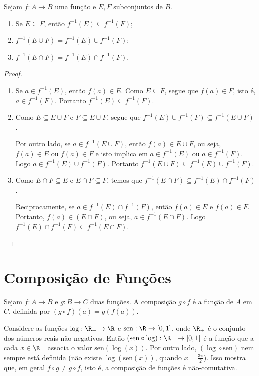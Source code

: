 \documentclass{article}
\begin{document}
\begin{proposition}\label{Img-inversa}
Sejam $f:A \rightarrow B$ uma fun\c{c}\~ao e $E, F$ subconjuntos de $B$.
\begin{enumerate}
    \item[(a)] Se $E \subseteq F$, ent\~ao $f^{-1}(E)\subseteq f^{-1}(F)$;
    \item[(b)] $f^{-1}(E \cup F)=f^{-1}(E)\cup f^{-1}(F)$;
    \item[(c)] $f^{-1}(E \cap F)=f^{-1}(E)\cap f^{-1}(F)$.
\end{enumerate}
\end{proposition}
\begin{proof}\mbox{}
\begin{enumerate}
    \item[(a)] Se $a \in f^{-1}(E)$, ent\~ao $f(a) \in E$.
    Como $E \subseteq F$, segue que $f(a) \in F$, isto \'e,
    $a \in f^{-1}(F)$. Portanto $f^{-1}(E)\subseteq f^{-1}(F)$.
    \item[(b)] Como $E \subseteq E \cup F$ e $F \subseteq E \cup
    F$, segue que $f^{-1}(E) \cup f^{-1}(F) \subseteq f^{-1}(E \cup
    F)$.

    Por outro lado, se $a \in f^{-1}(E \cup F)$, ent\~ao $f(a) \in E
    \cup F$, ou seja, $f(a) \in E$ ou $f(a) \in F$ e isto implica em
    $a \in f^{-1}(E)$ ou $a \in f^{-1}(F)$. Logo $a \in
    f^{-1}(E)\cup f^{-1}(F)$. Portanto $f^{-1}(E \cup F)
    \subseteq f^{-1}(E)\cup f^{-1}(F)$.
    \item[(c)] Como $E \cap F \subseteq E$ e $E \cap F \subseteq
    F$, temos que $f^{-1}(E \cap F)\subseteq f^{-1}(E)\cap
    f^{-1}(F)$.

    Reciprocamente, se $a \in f^{-1}(E) \cap f^{-1}(F)$, ent\~ao
    $f(a) \in E$ e $f(a) \in F$. Portanto, $f(a) \in (E \cap
    F)$, ou seja, $a \in f^{-1}(E \cap F)$. Logo $f^{-1}(E)
    \cap f^{-1}(F) \subseteq f^{-1}(E \cap F)$.
\end{enumerate}
\end{proof}

\section{Composi\c{c}\~ao de Fun\c{c}\~oes}
\begin{definition}
Sejam $f:A \rightarrow B$ e $g:B \rightarrow C$ duas fun\c{c}\~oes. A
composi\c{c}\~ao $g \circ f$ \'e a fun\c{c}\~ao de $A$ em $C$, definida por $(g
\circ f)(a)=g(f(a))$.
\end{definition}
\begin{example}\label{log-sen}
Considere as fun\c{c}\~oes $\log :\R_+ \rightarrow \R$ e $\mbox{sen}:\R
\rightarrow [0,1]$, onde $\R_+$ \'e o conjunto dos n\'umeros reais n\~ao
negativos. Ent\~ao $(\mbox{sen} \circ \log):\R_+ \rightarrow [0,1]$
\'e a fun\c{c}\~ao que a cada $x \in \R_+$ associa o valor
$\mbox{sen}(\log(x))$. Por outro lado, $(\log \circ \mbox{sen})$
nem sempre est\'a definida (n\~ao existe $\log( \mbox{sen}(x))$,
quando $x= \frac{3\pi}{2}$). Isso mostra que, em geral $f \circ g
\neq g \circ f$, isto \'e, a composi\c{c}\~ao de fun\c{c}\~oes \'e n\~ao-comutativa.
\end{example}
\end{document}
